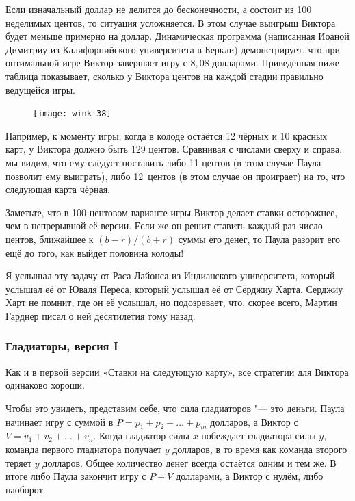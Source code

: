 \documentclass[twoside]{book}
\begin{document}
Если изначальный доллар не делится до бесконечности, а состоит из 100
неделимых центов, то ситуация усложняется.
В этом случае выигрыш
Виктора будет меньше примерно на доллар.
Динамическая программа
(написанная Иоаной Димитриу из Калифорнийского университета в Беркли)
демонстрирует, что при оптимальной игре Виктор завершает игру с
$8{,}08$ долларами.
Приведённая ниже таблица показывает, сколько у
Виктора центов на каждой стадии правильно ведущейся игры.

\begin{figure}[!ht]
\centering
\texttt{[image: wink-38]}
\end{figure}

Например, к моменту игры, когда в колоде остаётся 12 чёрных и 10
красных карт, у Виктора должно быть 129 центов.
Сравнивая с числами
сверху и справа, мы видим, что ему следует поставить либо 11 центов (в
этом случае Паула позволит ему выиграть), либо 12~центов (в этом
случае он проиграет) на то, что следующая карта чёрная.

Заметьте, что в 100-центовом варианте игры Виктор делает ставки осторожнее, чем в непрерывной её версии.
Если же он решит ставить каждый раз число центов, ближайшее к $(b - r)/(b + r)$ суммы его денег, то Паула разорит его ещё до того, как выйдет половина колоды!


Я услышал эту задачу от Раса Лайонса из Индианского университета, %
который услышал её от Юваля Переса, %
который услышал её от Серджиу Харта. %
Серджиу Харт не помнит, где он её услышал, но подозревает, что, скорее всего, Мартин Гарднер писал о ней десятилетия тому назад.

\subsubsection*{Гладиаторы, версия I}%

Как и в первой версии «Ставки на следующую карту», все стратегии для Виктора одинаково хороши.

Чтобы это увидеть, представим себе, что сила гладиаторов "--- это деньги.
Паула начинает игру с суммой в $P = p_1 + p_2 + \ldots + p_m$ долларов, 
а Виктор с $V = v_1 + v_2 + \ldots + v_n$.
Когда гладиатор силы $x$ побеждает гладиатора силы $y$, команда первого гладиатора получает $y$ долларов, в то время как команда второго теряет $y$ долларов.
Общее количество денег всегда остаётся одним и тем же.
В итоге либо Паула закончит игру с $P+V$ долларами, а Виктор с нулём, либо наоборот.
\end{document}
